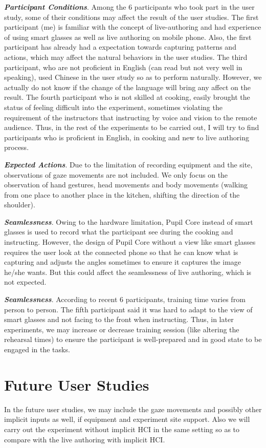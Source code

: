 \documentclass[fyp]{socreport}
\begin{document}
\textit{\textbf{Participant Conditions}}. Among the 6 participants who took part in the user study, some of their conditions may affect the result of the user studies. The first participant (me) is familiar with the concept of live-authoring and had experience of using smart glasses as well as live authoring on mobile phone. Also, the first participant has already had a expectation towards capturing patterns and actions, which may affect the natural behaviors in the user studies. The third participant, who are not proficient in English (can read but not very well in speaking), used Chinese in the user study so as to perform naturally. However, we actually do not know if the change of the language will bring any affect on the result. The fourth participant who is not skilled at cooking, easily brought the status of feeling difficult into the experiment, sometimes violating the requirement of the instructors that instructing by voice and vision to the remote audience. Thus, in the rest of the experiments to be carried out, I will try to find participants who is proficient in English, in cooking and new to live authoring process.

\textit{\textbf{Expected Actions}}. Due to the limitation of recording equipment and the site, observations of gaze movements are not included. We only focus on the observation of hand gestures, head movements and body movements (walking from one place to another place in the kitchen, shifting the direction of the shoulder).

\textit{\textbf{Seamlessness}}. Owing to the hardware limitation, Pupil Core instead of smart glasses is used to record what the participant see during the cooking and instructing. However, the design of Pupil Core without a view like smart glasses requires the user look at the connected phone so that he can know what is capturing and adjusts the angles sometimes to ensure it captures the image he/she wants. But this could affect the seamlessness of live authoring, which is not expected.

\textit{\textbf{Seamlessness}}. According to recent 6 participants, training time varies from person to person. The fifth participant said it was hard to adapt to the view of smart glasses and not facing to the front when instructing. Thus, in later experiments, we may increase or decrease training session (like altering the rehearsal times) to ensure the participant is well-prepared and in good state to be engaged in the tasks.

\section{Future User Studies}
In the future user studies, we may include the gaze movements and possibly other implicit inputs as well, if equipment and experiment site support. Also we will carry out the experiment without implicit HCI in the same setting so as to compare with the live authoring with implicit HCI.
\end{document}
